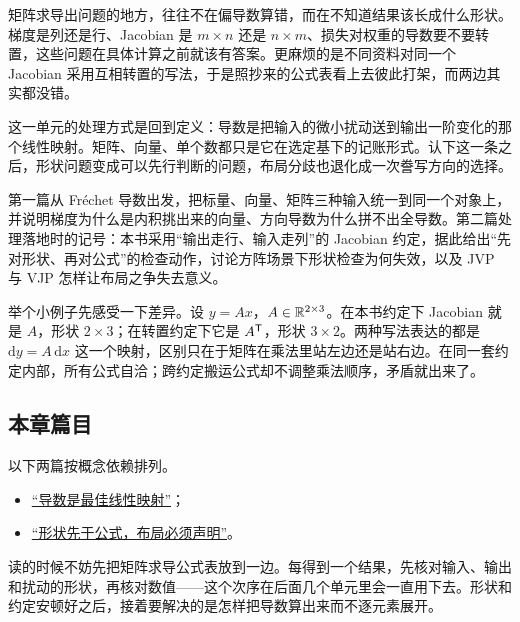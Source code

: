 矩阵求导出问题的地方，往往不在偏导数算错，而在不知道结果该长成什么形状。梯度是列还是行、Jacobian 是 \(m\times n\) 还是 \(n\times m\)、损失对权重的导数要不要转置，这些问题在具体计算之前就该有答案。更麻烦的是不同资料对同一个 Jacobian 采用互相转置的写法，于是照抄来的公式表看上去彼此打架，而两边其实都没错。

这一单元的处理方式是回到定义：导数是把输入的微小扰动送到输出一阶变化的那个线性映射。矩阵、向量、单个数都只是它在选定基下的记账形式。认下这一条之后，形状问题变成可以先行判断的问题，布局分歧也退化成一次誊写方向的选择。

第一篇从 Fréchet 导数出发，把标量、向量、矩阵三种输入统一到同一个对象上，并说明梯度为什么是内积挑出来的向量、方向导数为什么拼不出全导数。第二篇处理落地时的记号：本书采用``输出走行、输入走列''的 Jacobian 约定，据此给出``先对形状、再对公式''的检查动作，讨论方阵场景下形状检查为何失效，以及 JVP 与 VJP 怎样让布局之争失去意义。

举个小例子先感受一下差异。设 \(y=Ax\)，\(A\in\mathbb{R}^{2\times 3}\)。在本书约定下 Jacobian 就是 \(A\)，形状 \(2\times 3\)；在转置约定下它是 \(A^{\mathsf{T}}\)，形状 \(3\times 2\)。两种写法表达的都是 \(\mathrm dy=A\,\mathrm dx\) 这一个映射，区别只在于矩阵在乘法里站左边还是站右边。在同一套约定内部，所有公式自洽；跨约定搬运公式却不调整乘法顺序，矛盾就出来了。

\subsection{本章篇目}

以下两篇按概念依赖排列。

\begin{itemize}
\tightlist
\item \hyperref[sec:10-Matrix-Calculus/01-Derivative-Conventions/01]{``导数是最佳线性映射''}；
\item \hyperref[sec:10-Matrix-Calculus/01-Derivative-Conventions/02]{``形状先于公式，布局必须声明''}。
\end{itemize}

读的时候不妨先把矩阵求导公式表放到一边。每得到一个结果，先核对输入、输出和扰动的形状，再核对数值——这个次序在后面几个单元里会一直用下去。形状和约定安顿好之后，接着要解决的是怎样把导数算出来而不逐元素展开。
